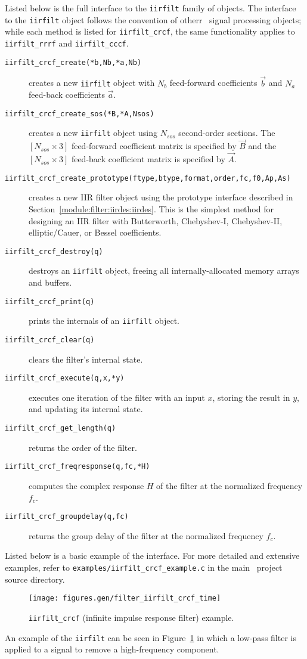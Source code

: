 Listed below is the full interface to the {\tt iirfilt} family of
objects.
The interface to the {\tt iirfilt} object follows the convention of
otherr \liquid\ signal processing objects;
while each method is listed for {\tt iirfilt\_crcf}, the same
functionality applies to {\tt iirfilt\_rrrf} and {\tt iirfilt\_cccf}.
%
\begin{description}
\item[{\tt iirfilt\_crcf\_create(*b,Nb,*a,Nb)}]
    creates a new {\tt iirfilt} object with
    $N_b$ feed-forward coefficients $\vec{b}$ and
    $N_a$ feed-back coefficients $\vec{a}$.
\item[{\tt iirfilt\_crcf\_create\_sos(*B,*A,Nsos)}]
    creates a new {\tt iirfilt} object using $N_{sos}$ second-order
    sections.
    The $[N_{sos} \times 3]$ feed-forward coefficient matrix is
    specified by $\vec{B}$ and
    the $[N_{sos} \times 3]$ feed-back coefficient matrix is
    specified by $\vec{A}$.
\item[{\tt iirfilt\_crcf\_create\_prototype(ftype,btype,format,order,fc,f0,Ap,As)}]
    creates a new IIR filter object using the prototype interface
    described in Section~\ref{module:filter:iirdes:iirdes}.
    This is the simplest method for designing an IIR filter with
    Butterworth, Chebyshev-I, Chebyshev-II, elliptic/Cauer, or Bessel
    coefficients.
\item[{\tt iirfilt\_crcf\_destroy(q)}]
    destroys an {\tt iirfilt} object, freeing all internally-allocated memory
    arrays and buffers.
\item[{\tt iirfilt\_crcf\_print(q)}]
    prints the internals of an {\tt iirfilt} object.
\item[{\tt iirfilt\_crcf\_clear(q)}]
    clears the filter's internal state.
\item[{\tt iirfilt\_crcf\_execute(q,x,*y)}]
    executes one iteration of the filter with an input $x$, storing the
    result in $y$, and updating its internal state.
\item[{\tt iirfilt\_crcf\_get\_length(q)}]
    returns the order of the filter.
\item[{\tt iirfilt\_crcf\_freqresponse(q,fc,*H)}]
    computes the complex response $H$ of the filter at the normalized
    frequency $f_c$.
\item[{\tt iirfilt\_crcf\_groupdelay(q,fc)}]
    returns the group delay of the filter at the normalized
    frequency $f_c$.
\end{description}
%
Listed below is a basic example of the interface.
For more detailed and extensive examples, refer to
{\tt examples/iirfilt\_crcf\_example.c}
in the main \liquid\ project source directory.
%

%
\begin{figure}
\centering
  \texttt{[image: figures.gen/filter\_iirfilt\_crcf\_time]}
\caption{
    {\tt iirfilt\_crcf} (infinite impulse response filter)
    example.}
\label{fig:module:filter:iirfilt_crcf}
\end{figure}
%
An example of the {\tt iirfilt} can be seen in
Figure~\ref{fig:module:filter:iirfilt_crcf}
in which a low-pass filter is applied to a signal to remove a
high-frequency component.

